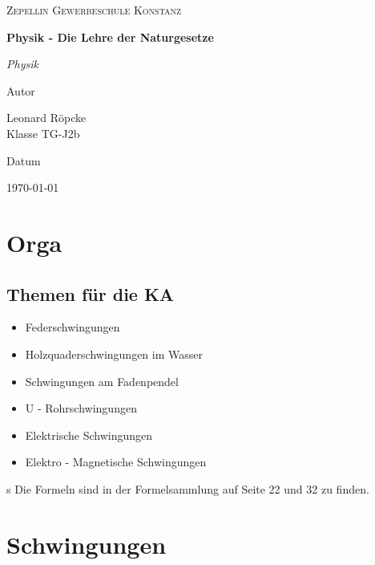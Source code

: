 \documentclass{article}
\newcommand{\AuthorName}{Leonard Röpcke\\Klasse TG-J2b}
\newcommand{\Institute}{Zepellin Gewerbeschule Konstanz}
\newcommand{\Subtitle}{Physik}
\newcommand{\MyDate}{\today}
\begin{document}
\begin{titlepage}
  \centering
  {\scshape\LARGE \Institute \par}
  \vspace{2.5cm}
{\huge\bfseries Physik - Die Lehre der Naturgesetze \par}
  \vspace{0.8cm}
  {\Large\itshape \Subtitle \par}
  \vfill
  {\Large Autor\par}
  {\Large \AuthorName \par}
  \vspace{1cm}
  {\Large Datum\par}
  {\Large \MyDate \par}
  \vfill
  \vspace{1cm}
  {\small }
\end{titlepage}
\tableofcontents
\newpage


\section{Orga}
\subsection{Themen für die KA}
\begin{itemize}
    \item Federschwingungen
    \item Holzquaderschwingungen im Wasser
    \item Schwingungen am Fadenpendel
    \item U - Rohrschwingungen
    \item Elektrische Schwingungen
    \item Elektro - Magnetische Schwingungen
\end{itemize}s
Die Formeln sind in der Formelsammlung auf Seite 22 und 32 zu finden.

\section{Schwingungen}
\end{document}
